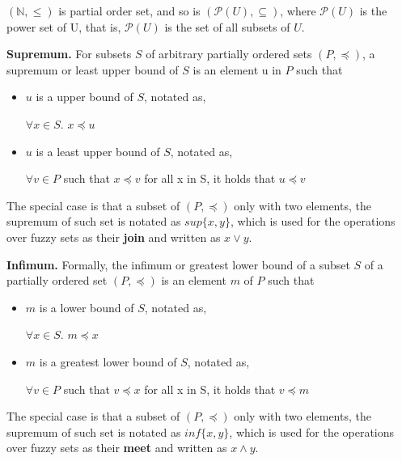 \begin{ex}
\label{ex:PartialOrder}
$(\mathbb{N},\leq)$ is partial order set, and so is $(\mathcal{P}(U),\subseteq)$, where $\mathcal{P}(U)$ is the power set of U, that is, $\mathcal{P}(U)$ is the set of all subsets of $U$.  
\end{ex}

\begin{defin} \textbf{Supremum.}
\label{def:Sup}
For subsets $S$ of arbitrary partially ordered sets $(P,\preceq)$, a supremum or least upper bound of $S$ is an element u in $P$ such that
\begin{itemize}
\item $u$ is a upper bound of $S$, notated as,

$\forall x \in S.$  $x \preceq u$

\item  $u$ is a least upper bound of $S$, notated as,

$\forall v \in P$ such that $x \preceq v$ for all x in S, it holds that $u \preceq v$

\end{itemize}
\end{defin}

The special case is that a subset of $(P,\preceq)$ only with two elements, the supremum of such set is notated as $sup\{x,y\}$, which is used for the operations over fuzzy sets as their \textbf{join} and written as $x \vee y$.

\begin{defin} \textbf{Infimum.}
\label{def:Inf}
Formally, the infimum or greatest lower bound of a subset $S$ of a partially ordered set 
$(P,\preceq)$ is an element $m$ of $P$ such that
\begin{itemize}
\item $m$ is a lower bound of $S$, notated as,

$\forall x \in S.$  $m \preceq x$

\item $m$ is a greatest lower bound of $S$, notated as,

$\forall v \in P$ such that $v \preceq x$ for all x in S, it holds that $v \preceq m$

\end{itemize}
\end{defin}

The special case is that a subset of $(P,\preceq)$ only with two elements, the supremum of such set is notated as $inf\{x,y\}$, which is used for the operations over fuzzy sets as their \textbf{meet} and written as $x \wedge y$.

